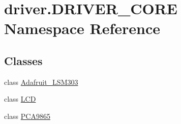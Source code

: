\hypertarget{namespacedriver_1_1DRIVER__CORE}{}\section{driver.\+D\+R\+I\+V\+E\+R\+\_\+\+C\+O\+R\+E Namespace Reference}
\label{namespacedriver_1_1DRIVER__CORE}
\subsection*{Classes}
\begin{DoxyCompactItemize}
\item 
class \hyperlink{classdriver_1_1DRIVER__CORE_1_1Adafruit__LSM303}{Adafruit\+\_\+\+L\+S\+M303}
\item 
class \hyperlink{classdriver_1_1DRIVER__CORE_1_1LCD}{L\+C\+D}
\item 
class \hyperlink{classdriver_1_1DRIVER__CORE_1_1PCA9865}{P\+C\+A9865}
\end{DoxyCompactItemize}
